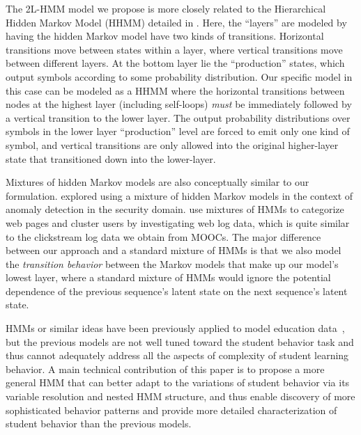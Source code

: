 The 2L-HMM model we propose is more closely related to the Hierarchical
Hidden Markov Model (HHMM) detailed in \citet{Fine:1998:ML}. Here, the
``layers'' are modeled by having the hidden Markov model have two kinds of
transitions.  Horizontal transitions move between states within a layer,
where vertical transitions move between different layers. At the bottom
layer lie the ``production'' states, which output symbols according to some
probability distribution. Our specific model in this case can be modeled as
a HHMM where the horizontal transitions between nodes at the highest layer
(including self-loops) \emph{must} be immediately followed by a vertical
transition to the lower layer. The output probability distributions over
symbols in the lower layer ``production'' level are forced to emit only one
kind of symbol, and vertical transitions are only allowed into the original
higher-layer state that transitioned down into the lower-layer.

Mixtures of hidden Markov models are also conceptually similar to our
formulation. \citet{Song:2009:NDSS} explored using a mixture of hidden
Markov models in the context of anomaly detection in the security domain.
\citet{Ypma:2002:Springer} use mixtures of HMMs to categorize web pages and
cluster users by investigating web log data, which is quite similar to the
clickstream log data we obtain from MOOCs. The major difference between
our approach and a standard mixture of HMMs is that we also model the
\emph{transition behavior} between the Markov models that make up our
model's lowest layer, where a standard mixture of HMMs would ignore the
potential dependence of the previous sequence's latent state on the next
sequence's latent state.

HMMs or similar ideas have been previously applied to model education
data~\cite{Shih:2010:EDM,Kizilcec:2013:LAK,Davis:2016:EDM}, but the
previous models are not well tuned toward the student behavior task and
thus cannot adequately address all the aspects of complexity of student
learning behavior.  A main technical contribution of this paper is to
propose a more general HMM that can better adapt to the variations of
student behavior via its variable resolution and nested HMM structure, and
thus enable discovery of more sophisticated behavior patterns and provide
more detailed characterization of student behavior than the previous
models.

